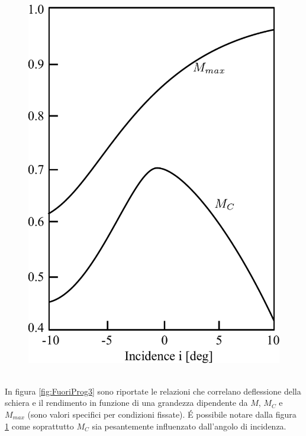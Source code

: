 \begin{figure}[h!]
\begin{minipage}{.4\textwidth}
		\includegraphics[width=\linewidth]{fig/FuoriProg4.pdf}
		\label{fig:FuoriProg4}
	\end{minipage}
\end{figure}
\\In figura \ref{fig:FuoriProg3} sono riportate le relazioni che correlano deflessione della schiera e il rendimento in funzione di una grandezza dipendente da $M$, $M_C$ e $M_{max}$ (sono valori specifici per condizioni fissate). \'E possibile notare dalla figura \ref{fig:FuoriProg4} come soprattutto $M_C$ sia pesantemente influenzato dall'angolo di incidenza.

